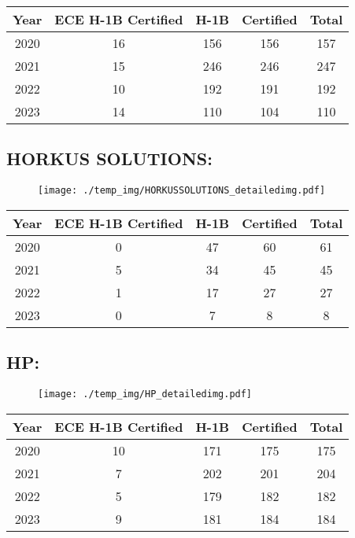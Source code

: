 \documentclass{article}%
\begin{document}
%
\begin{longtable}{c|c|c|c|c}%
\hline%
Year&ECE H{-}1B Certified&H{-}1B&Certified&Total\\%
\hline%
2020&16&156&156&157\\%
\hline%
2021&15&246&246&247\\%
\hline%
2022&10&192&191&192\\%
\hline%
2023&14&110&104&110\\%
\hline%
\end{longtable}

%
\newpage%
\subsection{HORKUS SOLUTIONS:}%
\label{subsec:HORKUSSOLUTIONS}%
\label{HORKUSSOLUTIONSdetailed}%


\begin{figure}[htbp]%
\centering%
\texttt{[image: ./temp\_img/HORKUSSOLUTIONS\_detailedimg.pdf]}%
\end{figure}

%
\begin{longtable}{c|c|c|c|c}%
\hline%
Year&ECE H{-}1B Certified&H{-}1B&Certified&Total\\%
\hline%
2020&0&47&60&61\\%
\hline%
2021&5&34&45&45\\%
\hline%
2022&1&17&27&27\\%
\hline%
2023&0&7&8&8\\%
\hline%
\end{longtable}

%
\newpage%
\subsection{HP:}%
\label{subsec:HP}%
\label{HPdetailed}%


\begin{figure}[htbp]%
\centering%
\texttt{[image: ./temp\_img/HP\_detailedimg.pdf]}%
\end{figure}

%
\begin{longtable}{c|c|c|c|c}%
\hline%
Year&ECE H{-}1B Certified&H{-}1B&Certified&Total\\%
\hline%
2020&10&171&175&175\\%
\hline%
2021&7&202&201&204\\%
\hline%
2022&5&179&182&182\\%
\hline%
2023&9&181&184&184\\%
\hline%
\end{longtable}
\end{document}
